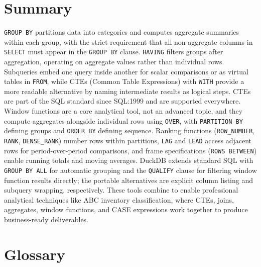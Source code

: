 \documentclass[
  letterpaper,
  DIV=11,
  numbers=noendperiod]{scrreprt}
\begin{document}
\section{Summary}\label{summary-8}

\texttt{GROUP\ BY} partitions data into categories and computes
aggregate summaries within each group, with the strict requirement that
all non-aggregate columns in \texttt{SELECT} must appear in the
\texttt{GROUP\ BY} clause. \texttt{HAVING} filters groups after
aggregation, operating on aggregate values rather than individual rows.
Subqueries embed one query inside another for scalar comparisons or as
virtual tables in \texttt{FROM}, while CTEs (Common Table Expressions)
with \texttt{WITH} provide a more readable alternative by naming
intermediate results as logical steps. CTEs are part of the SQL standard
since SQL:1999 and are supported everywhere. Window functions are a core
analytical tool, not an advanced topic, and they compute aggregates
alongside individual rows using \texttt{OVER}, with
\texttt{PARTITION\ BY} defining groups and \texttt{ORDER\ BY} defining
sequence. Ranking functions (\texttt{ROW\_NUMBER}, \texttt{RANK},
\texttt{DENSE\_RANK}) number rows within partitions, \texttt{LAG} and
\texttt{LEAD} access adjacent rows for period-over-period comparisons,
and frame specifications (\texttt{ROWS\ BETWEEN}) enable running totals
and moving averages. DuckDB extends standard SQL with
\texttt{GROUP\ BY\ ALL} for automatic grouping and the \texttt{QUALIFY}
clause for filtering window function results directly; the portable
alternatives are explicit column listing and subquery wrapping,
respectively. These tools combine to enable professional analytical
techniques like ABC inventory classification, where CTEs, joins,
aggregates, window functions, and CASE expressions work together to
produce business-ready deliverables.

\section{Glossary}\label{glossary-8}
\end{document}
